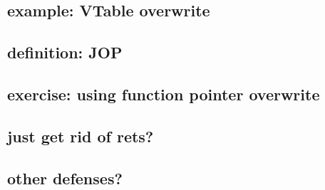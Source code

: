 \subsection{example: VTable overwrite}



\subsection{definition: JOP}



\subsection{exercise: using function pointer overwrite}


\subsection{just get rid of rets?}


\subsection{other defenses?}


